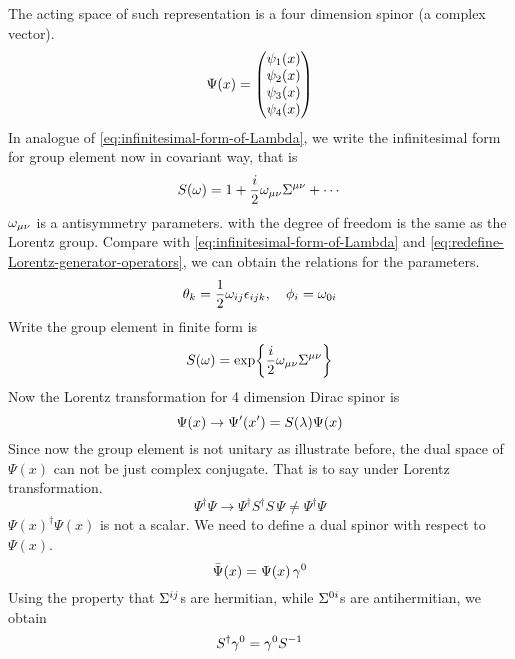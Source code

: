 The acting space of such representation is a four dimension spinor (a complex vector).
\begin{equation}
  \Psi(x) = \mqty(\psi_1(x)\\ \psi_2(x)\\ \psi_3(x)\\ \psi_4(x))
\end{equation}
In analogue of \eqref{eq:infinitesimal-form-of-Lambda}, we write the infinitesimal form for group element now in covariant way, that is
\begin{equation} \label{the infinitesimal form of Sla}
S(\omega) = 1+ \frac{i}{2}\omega_{\mu\nu}\Sigma^{\mu\nu}+\cdots
\end{equation}
$\omega_{\mu\nu}$ is a antisymmetry parameters. with the degree of freedom is the same as the Lorentz group. Compare with \eqref{eq:infinitesimal-form-of-Lambda} and \eqref{eq:redefine-Lorentz-generator-operators}, we can obtain the relations for the parameters.
\begin{equation} \label{parameter redefinition}
\theta_k = \frac{1}{2} \omega_{ij}\epsilon_{ijk}, \quad \phi_i = \omega_{0i}
\end{equation}
Write the group element in finite form is
\begin{equation} \label{the finite form of Sla}
S(\omega) = \exp{\frac{i}{2}\omega_{\mu\nu}\Sigma^{\mu\nu}}
\end{equation}
Now the Lorentz transformation for 4 dimension Dirac spinor  is
\begin{equation} \label{Lorentz transformation of Dirac spinor}
\Psi(x)\rightarrow\Psi'(x') = S(\lambda)\Psi(x)
\end{equation}
Since now the group element is not unitary as illustrate before, the dual space of $\Psi(x)$ can not be just complex conjugate. That is to say under Lorentz  transformation.
\begin{equation}
  \Psi^{\dagger} \Psi
\rightarrow
\Psi^{\dagger} S^{\dagger} S \, \Psi \neq \Psi^{\dagger} \Psi
\end{equation}
$\Psi(x)^{\dagger} \Psi(x) $ is not a scalar.
We need to define a dual spinor with respect to $\Psi(x)$.
\begin{equation} \label{definition of dual spinor}
\bar{\Psi}(x) = \Psi(x)\,\gamma^0
\end{equation}
Using the property that $\Sigma^{ij}$s are hermitian, while $\Sigma^{0i}$s are antihermitian, we obtain
\begin{equation} \label{property of S(lambda)}
S^{\dagger} \gamma^0 = \gamma^0 S^{-1}
\end{equation}
